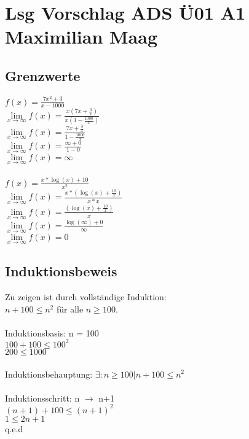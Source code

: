 \documentclass{article}
\begin{document}
	\section*{Lsg Vorschlag ADS Ü01 A1 Maximilian Maag}
	\subsection*{Grenzwerte}
	$f(x) = \frac{7x^{2}+3}{x-1000}$ \\
	$\lim\limits_{x\to\infty} f(x) = \frac{x(7x+\frac{3}{x})}{x(1-\frac{1000}{x})}$ \\
	$\lim\limits_{x\to\infty} f(x) = \frac{7x+\frac{3}{x}}{1-\frac{1000}{x}}$ \\
	$\lim\limits_{x\to\infty} f(x) = \frac{\infty+0}{1-0}$ \\
	$\lim\limits_{x\to\infty} f(x) = \infty$ \\
	 \\
	$f(x) = \frac{x*\log(x) + 10}{x^{2}}$ \\
	$\lim\limits_{x\to\infty} f(x) = \frac{x*(\log(x) + \frac{10}{x})}{x*x}$ \\
	$\lim\limits_{x\to\infty} f(x) = \frac{(\log(x) + \frac{10}{x})}{x}$ \\
	$\lim\limits_{x\to\infty} f(x) = \frac{\log(\infty) + 0}{\infty}$ \\
	$\lim\limits_{x\to\infty} f(x) = 0$
	\subsection*{Induktionsbeweis}
	Zu zeigen ist durch vollständige Induktion: \\
	$n + 100 \leq n^{2}$ für alle $n \geq 100$. \\ \\
	Induktionsbasis: n = 100 \\
	$100 + 100 \leq 100^2$ \\
	$200 \leq 1000$ \\ \\
	Induktionsbehauptung: $\exists: n \geq 100 | n + 100 \leq n^2$ \\ \\
	Induktionsschritt: n $\to$ n+1 \\
	$(n+1) + 100 \leq (n+1)^2$ \\
	$1 \leq 2n +1$ \\
	q.e.d
\end{document}
